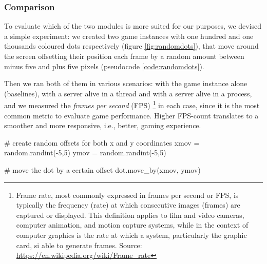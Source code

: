 \subsubsection{Comparison}

To evaluate which of the two modules is more suited for our purposes, we devised a simple experiment: we created two game instances with one hundred and one thousands coloured dots respectively (figure \ref{fig:randomdots}), that move around the screen offsetting their position each frame by a random amount between minus five and plus five pixels (pseudocode \ref{code:randomdots}).

Then we ran both of them in various scenarios: with the game instance alone (baselines), with a server alive in a thread and with a server alive in a process, and we measured the \textit{frames per second} (FPS) \footnote{Frame rate, most commonly expressed in frames per second or FPS, is typically the frequency (rate) at which consecutive images (frames) are captured or displayed. This definition applies to film and video cameras, computer animation, and motion capture systems, while in the context of computer graphics is the rate at which a system, particularly the graphic card, si able to generate frames. Source: \url{https://en.wikipedia.org/wiki/Frame_rate}} in each case, since it is the most common metric to evaluate game performance. Higher FPS-count translates to a smoother and more responsive, i.e., better, gaming experience.

\label{code:randomdots}
\begin{python} 
# create random offsets for both x and y coordinates
xmov = random.randint(-5,5)
ymov = random.randint(-5,5)

# move the dot by a certain offset
dot.move_by(xmov, ymov)
\end{python}

